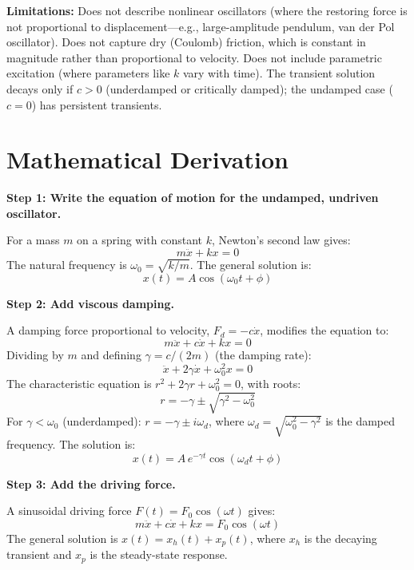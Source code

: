 \textbf{Limitations:} Does not describe nonlinear oscillators (where the restoring force is not proportional to displacement---e.g., large-amplitude pendulum, van der Pol oscillator). Does not capture dry (Coulomb) friction, which is constant in magnitude rather than proportional to velocity. Does not include parametric excitation (where parameters like $k$ vary with time). The transient solution decays only if $c > 0$ (underdamped or critically damped); the undamped case ($c = 0$) has persistent transients.


\section*{Mathematical Derivation}

\textbf{Step 1: Write the equation of motion for the undamped, undriven oscillator.}

For a mass $m$ on a spring with constant $k$, Newton's second law gives:
\begin{equation}
m\ddot{x} + kx = 0
\end{equation}
The natural frequency is $\omega_0 = \sqrt{k/m}$. The general solution is:
\begin{equation}
x(t) = A\cos(\omega_0 t + \phi)
\end{equation}

\textbf{Step 2: Add viscous damping.}

A damping force proportional to velocity, $F_d = -c\dot{x}$, modifies the equation to:
\begin{equation}
m\ddot{x} + c\dot{x} + kx = 0
\end{equation}
Dividing by $m$ and defining $\gamma = c/(2m)$ (the damping rate):
\begin{equation}
\ddot{x} + 2\gamma\dot{x} + \omega_0^2 x = 0
\end{equation}
The characteristic equation is $r^2 + 2\gamma r + \omega_0^2 = 0$, with roots:
\begin{equation}
r = -\gamma \pm \sqrt{\gamma^2 - \omega_0^2}
\end{equation}
For $\gamma < \omega_0$ (underdamped): $r = -\gamma \pm i\omega_d$, where $\omega_d = \sqrt{\omega_0^2 - \gamma^2}$ is the damped frequency. The solution is:
\begin{equation}
x(t) = A\,e^{-\gamma t}\cos(\omega_d t + \phi)
\end{equation}

\textbf{Step 3: Add the driving force.}

A sinusoidal driving force $F(t) = F_0\cos(\omega t)$ gives:
\begin{equation}
m\ddot{x} + c\dot{x} + kx = F_0\cos(\omega t)
\end{equation}
The general solution is $x(t) = x_h(t) + x_p(t)$, where $x_h$ is the decaying transient and $x_p$ is the steady-state response.

